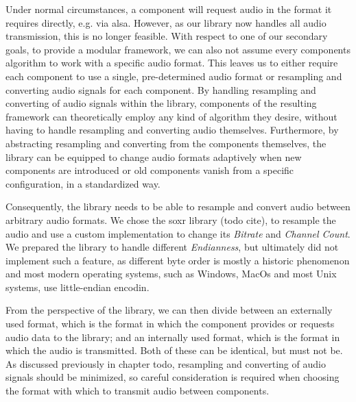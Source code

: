Under normal circumstances, a component will request audio in the format it requires directly, e.g. via \gls{alsa}.
However, as our library now handles all audio transmission, this is no longer feasible.
With respect to one of our secondary goals, to provide a modular framework, we can also not assume every components algorithm to work with a specific audio format.
This leaves us to either require each component to use a single, pre-determined audio format or resampling and converting audio signals for each component.
By handling resampling and converting of audio signals within the library, components of the resulting framework can theoretically employ any kind of algorithm they desire, without having to handle resampling and converting audio themselves.
Furthermore, by abstracting resampling and converting from the components themselves, the library can be equipped to change audio formats adaptively when new components are introduced or old components vanish from a specific configuration, in a standardized way.

Consequently, the library needs to be able to resample and convert audio between arbitrary audio formats.
We chose the \gls{soxr} library (todo cite), to resample the audio and use a custom implementation to change its \textit{Bitrate} and \textit{Channel Count}.
We prepared the library to handle different \textit{Endianness}, but ultimately did not implement such a feature, as different byte order is mostly a historic phenomenon and most modern operating systems, such as Windows, MacOs and most Unix systems, use little-endian encodin.

From the perspective of the library, we can then divide between an externally used format, which is the format in which the component provides or requests audio data to the library; and an internally used format, which is the format in which the audio is transmitted.
Both of these can be identical, but must not be.
As discussed previously in chapter todo, resampling and converting of audio signals should be minimized, so careful consideration is required when choosing the format with which to transmit audio between components.

